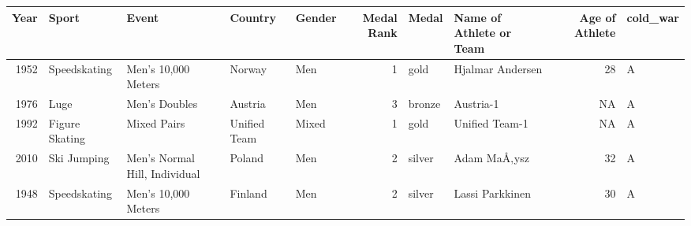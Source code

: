 \documentclass[]{book}
\theoremstyle{definition}
\theoremstyle{definition}
\theoremstyle{definition}
\theoremstyle{remark}
\begin{document}
\begin{tabular}{r|l|l|l|l|r|l|l|r|l}
\hline
Year & Sport & Event & Country & Gender & Medal Rank & Medal & Name of Athlete or Team & Age of Athlete & cold\_war\\
\hline
1952 & Speedskating & Men's 10,000 Meters & Norway & Men & 1 & gold & Hjalmar Andersen & 28 & A\\
\hline
1976 & Luge & Men's Doubles & Austria & Men & 3 & bronze & Austria-1 & NA & A\\
\hline
1992 & Figure Skating & Mixed Pairs & Unified Team & Mixed & 1 & gold & Unified Team-1 & NA & A\\
\hline
2010 & Ski Jumping & Men's Normal Hill, Individual & Poland & Men & 2 & silver & Adam MaÅ‚ysz & 32 & A\\
\hline
1948 & Speedskating & Men's 10,000 Meters & Finland & Men & 2 & silver & Lassi Parkkinen & 30 & A\\
\hline
\end{tabular}
\end{document}
